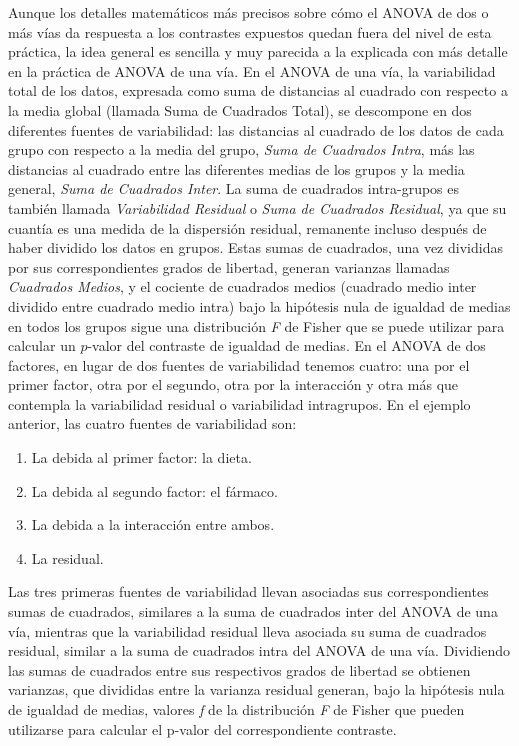 \documentclass[
  a4paper,
]{scrreport}
\providecommand{\tightlist}{%
  \setlength{\itemsep}{0pt}\setlength{\parskip}{0pt}}\usepackage{longtable,booktabs,array}
\theoremstyle{plain}
\theoremstyle{definition}
\theoremstyle{definition}
\theoremstyle{remark}
\begin{document}
Aunque los detalles matemáticos más precisos sobre cómo el ANOVA de dos
o más vías da respuesta a los contrastes expuestos quedan fuera del
nivel de esta práctica, la idea general es sencilla y muy parecida a la
explicada con más detalle en la práctica de ANOVA de una vía. En el
ANOVA de una vía, la variabilidad total de los datos, expresada como
suma de distancias al cuadrado con respecto a la media global (llamada
Suma de Cuadrados Total), se descompone en dos diferentes fuentes de
variabilidad: las distancias al cuadrado de los datos de cada grupo con
respecto a la media del grupo, \emph{Suma de Cuadrados Intra}, más las
distancias al cuadrado entre las diferentes medias de los grupos y la
media general, \emph{Suma de Cuadrados Inter}. La suma de cuadrados
intra-grupos es también llamada \emph{Variabilidad Residual} o
\emph{Suma de Cuadrados Residual}, ya que su cuantía es una medida de la
dispersión residual, remanente incluso después de haber dividido los
datos en grupos. Estas sumas de cuadrados, una vez divididas por sus
correspondientes grados de libertad, generan varianzas llamadas
\emph{Cuadrados Medios}, y el cociente de cuadrados medios (cuadrado
medio inter dividido entre cuadrado medio intra) bajo la hipótesis nula
de igualdad de medias en todos los grupos sigue una distribución
\emph{F} de Fisher que se puede utilizar para calcular un \(p\)-valor
del contraste de igualdad de medias. En el ANOVA de dos factores, en
lugar de dos fuentes de variabilidad tenemos cuatro: una por el primer
factor, otra por el segundo, otra por la interacción y otra más que
contempla la variabilidad residual o variabilidad intragrupos. En el
ejemplo anterior, las cuatro fuentes de variabilidad son:

\begin{enumerate}
\def\labelenumi{\arabic{enumi}.}
\tightlist
\item
  La debida al primer factor: la dieta.
\item
  La debida al segundo factor: el fármaco.
\item
  La debida a la interacción entre ambos.
\item
  La residual.
\end{enumerate}

Las tres primeras fuentes de variabilidad llevan asociadas sus
correspondientes sumas de cuadrados, similares a la suma de cuadrados
inter del ANOVA de una vía, mientras que la variabilidad residual lleva
asociada su suma de cuadrados residual, similar a la suma de cuadrados
intra del ANOVA de una vía. Dividiendo las sumas de cuadrados entre sus
respectivos grados de libertad se obtienen varianzas, que divididas
entre la varianza residual generan, bajo la hipótesis nula de igualdad
de medias, valores \emph{f} de la distribución \emph{F} de Fisher que
pueden utilizarse para calcular el p-valor del correspondiente
contraste.
\end{document}

